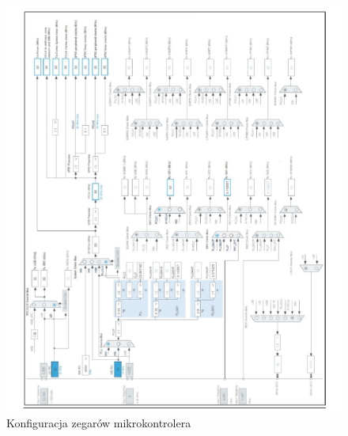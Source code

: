 \documentclass[10pt, a4paper]{article}
\begin{document}
\begin{figure}[H]
\includegraphics[width=17cm]{figures/zeg.png}
\caption{Konfiguracja zegarów mikrokontrolera}
\end{figure}
\newpage
\end{document}
